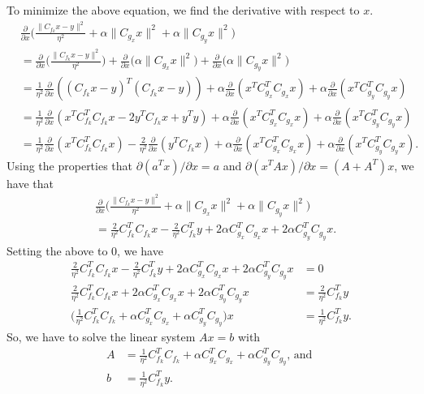 \documentclass[10pt]{article}
\begin{document}
\begin{itemize}
  To minimize the above equation, we find the derivative with respect to $x$.
  \begin{align*}
    &\frac{\partial}{\partial x} \bigg( \frac{\| C_{f_k} x - y \|^2}{\eta^2} + \alpha \| C_{g_x} x \|^2 + \alpha \| C_{g_y} x \|^2 \bigg)\\
    &= \frac{\partial}{\partial x} \bigg( \frac{\| C_{f_k} x - y \|^2}{\eta^2}\bigg)  + \frac{\partial}{\partial x} \bigg( \alpha \| C_{g_x} x \|^2 \bigg)   + \frac{\partial}{\partial x} \bigg( \alpha \| C_{g_y} x \|^2 \bigg)\\
    &= \frac{1}{\eta^2} \frac{\partial}{\partial x} ((C_{f_k}x - y)^T (C_{f_k}x - y) ) + \alpha \frac{\partial}{\partial x} (x^T C_{g_x}^T C_{g_x}x) + \alpha \frac{\partial}{\partial x} (x^T C_{g_y}^T C_{g_y}x)\\
    &= \frac{1}{\eta^2} \frac{\partial}{\partial x} ( x^T C_{f_k}^T C_{f_k}x - 2 y^T C_{f_k} x + y^T y ) + \alpha \frac{\partial}{\partial x} (x^T C_{g_x}^T C_{g_x}x) + \alpha \frac{\partial}{\partial x} (x^T C_{g_y}^T C_{g_y}x)\\    
    &= \frac{1}{\eta^2} \frac{\partial}{\partial x} ( x^T C_{f_k}^T C_{f_k}x) - \frac{2}{\eta^2} \frac{\partial}{\partial x} ( y^T C_{f_k} x) + \alpha \frac{\partial}{\partial x} (x^T C_{g_x}^T C_{g_x}x) + \alpha \frac{\partial}{\partial x} (x^T C_{g_y}^T C_{g_y}x).
  \end{align*}
  Using the properties that $\partial(a^T x) /\partial{x} = a$ and  $\partial(x^T A x)/\partial x = (A + A^T) x$, we have that
  \begin{align*}
    &\frac{\partial}{\partial x} \bigg( \frac{\| C_{f_k} x - y \|^2}{\eta^2} + \alpha \| C_{g_x} x \|^2 + \alpha \| C_{g_y} x \|^2 \bigg)\\
    &= \frac{2}{\eta^2} C_{f_k}^T C_{f_k}x - \frac{2}{\eta^2} C_{f_k}^T y + 2\alpha  C_{g_x}^T C_{g_x}x + 2\alpha C_{g_y}^T C_{g_y}x.
  \end{align*}
  Setting the above to 0, we have
  \begin{align*}
  \frac{2}{\eta^2} C_{f_k}^T C_{f_k}x - \frac{2}{\eta^2} C_{f_k}^T y + 2\alpha  C_{g_x}^T C_{g_x}x + 2\alpha C_{g_y}^T C_{g_y}x &= 0\\  
  \frac{2}{\eta^2} C_{f_k}^T C_{f_k}x  + 2\alpha  C_{g_x}^T C_{g_x}x + 2\alpha C_{g_y}^T C_{g_y}x &= \frac{2}{\eta^2} C_{f_k}^T y\\
  \bigg( \frac{1}{\eta^2} C_{f_k}^T C_{f_k}  + \alpha  C_{g_x}^T C_{g_x} + \alpha C_{g_y}^T C_{g_y} \bigg)x &= \frac{1}{\eta^2} C_{f_k}^T y.
  \end{align*}
  So, we have to solve the linear system $Ax = b$ with
  \begin{align*}
    A &= \frac{1}{\eta^2} C_{f_k}^T C_{f_k}  + \alpha  C_{g_x}^T C_{g_x} + \alpha C_{g_y}^T C_{g_y} \mbox{, and }\\
    b &=\frac{1}{\eta^2} C_{f_k}^T y.
  \end{align*}
  

\end{itemize}
\end{document}
